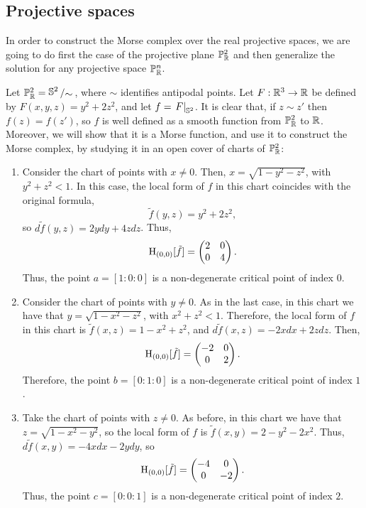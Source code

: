 \subsection{Projective spaces}

In order to construct the Morse complex over the real projective spaces, we are going to do first the case of the projective plane $\mathbb{P}_{\mathbb{R}}^2$ and then generalize the solution for any projective space $\mathbb{P}_{\mathbb{R}}^n$.

\begin{exmpl}
Let $\con{P}_{\R}^2 = \quocient{\con{S}^2}{\sim}$, where $\sim$ identifies antipodal points. Let $F : \mathbb{R}^3 \rightarrow \mathbb{R}$ be defined by $F(x,y,z) = y^2+2z^2$, and let $f = \left. F \right|_{\mathbb{S}^2}$. It is clear that, if $z \sim z'$ then $f(z) = f(z')$, so $f$ is well defined as a smooth function from $\mathbb{P}_{\mathbb{R}}^2$ to $\mathbb{R}$. Moreover, we will show that it is a Morse function, and use it to construct the Morse complex, by studying it in an open cover of charts of $\mathbb{P}_{\mathbb{R}}^2$:

\begin{enumerate}
	\item Consider the chart of points with $x \neq 0$. Then, $x = \sqrt{1-y^2-z^2}$, with $y^2+z^2<1$. In this case, the local form of $f$ in this chart coincides with the original formula,
	\[\tilde{f}(y,z) = y^2+2z^2,\]
	so $d\tilde{f}(y,z) = 2ydy+4zdz$. Thus,
	\[\operatorname H_{(0,0)}[\tilde{f}] = \begin{pmatrix} 2 & 0 \\ 0 & 4 \end{pmatrix} .\]
	Thus, the point $a = [1:0:0]$ is a non-degenerate critical point of index $0$.
	\item Consider the chart of points with $y \neq 0$. As in the last case, in this chart we have that $y = \sqrt{1-x^2-z^2}$, with $x^2+z^2<1$. Therefore, the local form of $f$ in this chart is $\tilde{f}(x,z) = 1-x^2+z^2$, and $d\tilde{f}(x,z) = -2xdx+2zdz$. Then,
	\[\operatorname H_{(0,0)}[\tilde{f}] = \begin{pmatrix} -2 & 0 \\ 0 & 2 \end{pmatrix} .\]
	Therefore, the point $b = [0:1:0]$ is a non-degenerate critical point of index $1$.
	\item Take the chart of points with $z \neq 0$. As before, in this chart we have that $z = \sqrt{1-x^2-y^2}$, so the local form of $f$ is $\tilde{f}(x,y) = 2-y^2-2x^2$. Thus, $d\tilde{f}(x,y) = -4xdx-2ydy$, so
	\[\operatorname H_{(0,0)}[\tilde{f}] = \begin{pmatrix} -4 & 0 \\ 0 & -2 \end{pmatrix} .\]
	Thus, the point $c=[0:0:1]$ is a non-degenerate critical point of index $2$.
\end{enumerate}


\end{exmpl}
